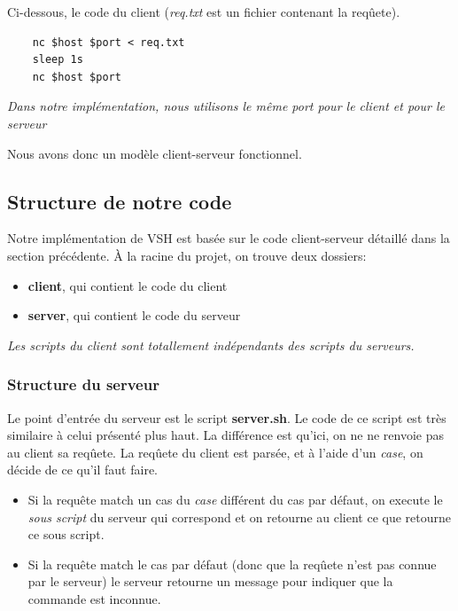 \documentclass[titlepage]{article}
\begin{document}
	Ci-dessous, le code du client (\textit{req.txt} est un fichier contenant la reqûete).

	\begin{lstlisting}
	nc $host $port < req.txt
	sleep 1s
	nc $host $port
	\end{lstlisting}

	\textit{Dans notre implémentation, nous utilisons le même port pour le client et pour le serveur}

	Nous avons donc un modèle client-serveur fonctionnel.

	\subsection{Structure de notre code}

	Notre implémentation de VSH est basée sur le code client-serveur détaillé dans la section précédente.
	À la racine du projet, on trouve deux dossiers:
	\begin{itemize}  
		\item \textbf{client}, qui contient le code du client 
		\item \textbf{server}, qui contient le code du serveur
	\end{itemize}

	\textit{Les scripts du client sont totallement indépendants des scripts du serveurs.}

	\subsubsection{Structure du serveur}
	Le point d'entrée du serveur est le script \textbf{server.sh}. Le code de ce script est très similaire à celui présenté plus haut. La différence est qu'ici, on ne ne renvoie pas au client sa reqûete. La reqûete du client est parsée, et à l'aide d'un \textit{case}, on décide de ce qu'il faut faire.
	\begin{itemize}  
		\item Si la requête match un cas du \textit{case} différent du cas par défaut, on execute le \textit{sous script} du serveur qui correspond et on retourne au client ce que retourne ce sous script.
		\item Si la requête match le cas par défaut (donc que la reqûete n'est pas connue par le serveur) le serveur retourne un message pour indiquer que la commande est inconnue.
	\end{itemize}
\end{document}
